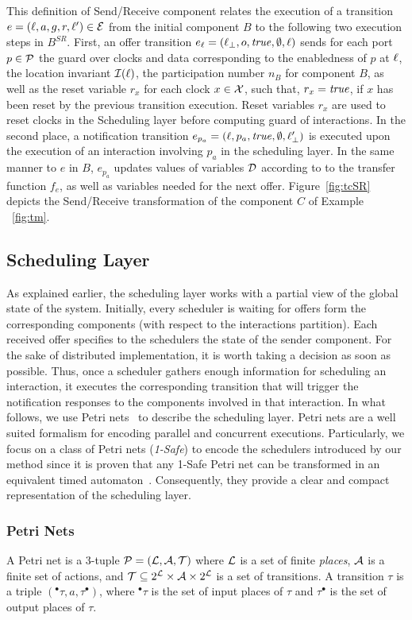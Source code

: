 This definition of Send/Receive component relates the execution of a transition 
$e=(\ell,a,g,r,\ell')\in\mathcal{E}$ from the initial component $B$ to the following two 
execution steps in $B^{SR}$. First, an offer transition $e_{\ell}=(\ell_{\perp},o,\textnormal{\textit{true}},\emptyset,\ell)$
sends for each port $p\in\mathcal{P}$ the guard over clocks and data corresponding to the enabledness
of $p$ at $\ell$, the location invariant $\mathcal{I}(\ell)$, the participation number $n_B$ for
component $B$, as well as the reset variable $r_x$ for each clock $x\in\mathcal{X}$, such that,
$r_x=\textnormal{\textit{true}}$, if $x$ has been reset by the previous transition execution. Reset variables
$r_x$ are used to reset clocks in the Scheduling layer before computing guard of interactions.
In the second place, a notification transition $e_{p_a}=(\ell,p_a,\textnormal{\textit{true}},\emptyset,\ell_{\perp}')$  
is executed upon the execution of an interaction involving $p_a$ in the scheduling layer. 
In the same manner to $e$ in $B$, $e_{p_a}$ updates values of variables $\mathcal{D}$ according to
to the transfer function $f_e$, as well as variables needed for the next offer. 
Figure~\ref{fig:tcSR} depicts the Send/Receive transformation of the component $C$ of Example
~\ref{fig:tm}.

\subsection{Scheduling Layer}
As explained earlier, the scheduling layer works with a partial view of the global state of 
the system. Initially, every scheduler is waiting for offers form the corresponding components
(with respect to the interactions partition). Each received offer specifies to the schedulers
the state of the sender component. For the sake of distributed implementation, it is
worth taking a decision as soon as possible. Thus, once a scheduler gathers enough information 
for scheduling an interaction, it executes the corresponding transition that will trigger
the notification responses to the components involved in that interaction.
In what follows, we use Petri nets~\cite{} to describe the scheduling layer. 
Petri nets are a well suited formalism for encoding parallel and concurrent executions. 
Particularly, we focus on a class of Petri nets (\emph{1-Safe}) to encode the schedulers
introduced by our method since it is proven that any 1-Safe Petri net can be transformed in
an equivalent timed automaton~\cite{}. 
Consequently, they provide a clear and compact representation 
of the scheduling layer.

\subsubsection{Petri Nets}
\begin{definition}\label{def:pn}
  A Petri net is a 3-tuple $\mathcal{P}=(\mathcal{L},\mathcal{A},\mathcal{T})$ where $\mathcal{L}$ is a set of finite
  \emph{places}, $\mathcal{A}$ is a finite set of actions, and $\mathcal{T}\subseteq 2^{\mathcal{L}}\times
  \mathcal{A}\times 2^{\mathcal{L}}$ is a set of transitions. A transition $\tau$ is a triple 
  $(^\bullet\tau,a, \tau^{\bullet})$, where $^\bullet\tau$ is the set of input places of 
  $\tau$ and $\tau^{\bullet}$ is 
  the set of output places of $\tau$.
\end{definition}

